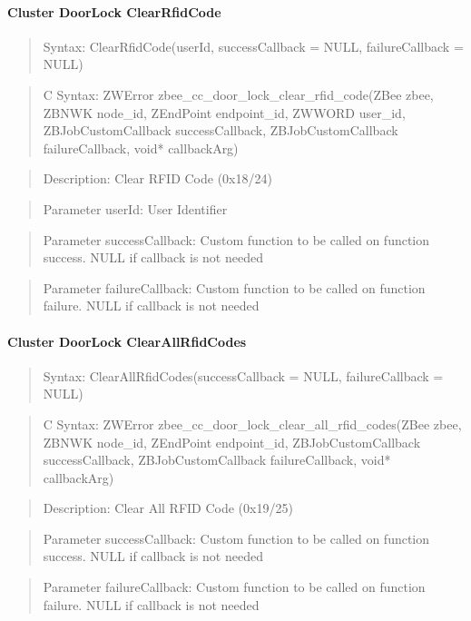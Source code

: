 \paragraph{Cluster DoorLock ClearRfidCode}
\begin{quote}Syntax: ClearRfidCode(userId, successCallback = NULL, failureCallback = NULL)\end{quote}
\begin{quote}C Syntax: ZWError zbee\_cc\_door\_lock\_clear\_rfid\_code(ZBee zbee, ZBNWK node\_id, ZEndPoint endpoint\_id, ZWWORD user\_id, ZBJobCustomCallback successCallback, ZBJobCustomCallback failureCallback, void* callbackArg)\end{quote}
\begin{quote}Description: Clear RFID Code (0x18/24)\end{quote}
\begin{quote}Parameter userId: User Identifier\end{quote}
\begin{quote}Parameter successCallback: Custom function to be called on function success. NULL if callback is not needed\end{quote}
\begin{quote}Parameter failureCallback: Custom function to be called on function failure. NULL if callback is not needed\end{quote}


\paragraph{Cluster DoorLock ClearAllRfidCodes}
\begin{quote}Syntax: ClearAllRfidCodes(successCallback = NULL, failureCallback = NULL)\end{quote}
\begin{quote}C Syntax: ZWError zbee\_cc\_door\_lock\_clear\_all\_rfid\_codes(ZBee zbee, ZBNWK node\_id, ZEndPoint endpoint\_id, ZBJobCustomCallback successCallback, ZBJobCustomCallback failureCallback, void* callbackArg)\end{quote}
\begin{quote}Description: Clear All RFID Code (0x19/25)\end{quote}
\begin{quote}Parameter successCallback: Custom function to be called on function success. NULL if callback is not needed\end{quote}
\begin{quote}Parameter failureCallback: Custom function to be called on function failure. NULL if callback is not needed\end{quote}


